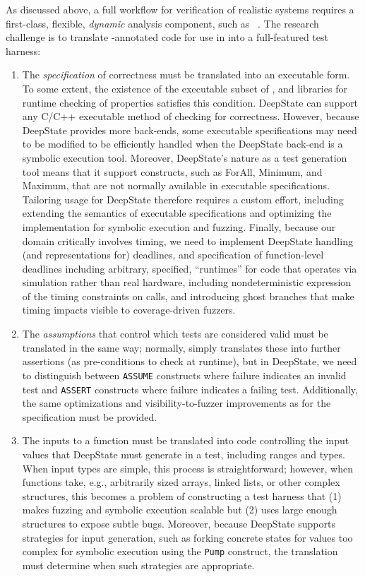 As discussed above, a full workflow for verification of realistic systems requires a first-class, flexible, \emph{dynamic} analysis component, such as \deepstate~\cite{DeepState}.  The research challenge is to translate \acsl-annotated code for use in \framac into a full-featured \deepstate test harness:

\begin{enumerate}[labelsep=3pt,leftmargin=12pt]
\item The \emph{specification} of correctness must be translated into an executable form.  To some extent, the existence of the \eacsl executable subset of \acsl, and libraries for runtime checking of properties satisfies this condition.  DeepState can support any C/C++ executable method of checking for correctness.  However, because DeepState provides more back-ends, some executable specifications may need to be modified to be efficiently handled when the DeepState back-end is a symbolic execution tool.  Moreover, DeepState's nature as a test generation tool means that it support constructs, such as ForAll, Minimum, and Maximum, that are not normally available in executable specifications.  Tailoring \eacsl usage for DeepState therefore requires a custom effort, including extending the semantics of executable specifications and optimizing the implementation for symbolic execution and fuzzing.  Finally, because our domain critically involves timing, we need to implement DeepState handling (and \eacsl representations for) deadlines, and specification of function-level deadlines including arbitrary, specified, ``runtimes'' for code that operates via simulation rather than real hardware, including nondeterministic expression of the timing constraints on calls, and introducing ghost branches that make timing impacts visible to coverage-driven fuzzers.
\item The \emph{assumptions} that control which tests are considered valid must be translated in the same way; normally, \eacsl simply translates these into further assertions (as pre-conditions to check at runtime), but in DeepState, we need to distinguish between {\tt ASSUME} constructs where failure indicates an invalid test and {\tt ASSERT} constructs where failure indicates a failing test.  Additionally, the same optimizations and visibility-to-fuzzer improvements as for the specification must be provided.
\item The inputs to a function must be translated into code controlling the input values that DeepState must generate in a test, including ranges and types.  When input types are simple, this process is straightforward; however, when functions take, e.g., arbitrarily sized arrays, linked lists, or other complex structures, this becomes a problem of constructing a test harness that (1) makes fuzzing and symbolic execution scalable but (2) uses large enough structures to expose subtle bugs.  Moreover, because DeepState supports strategies for input generation, such as forking concrete states for values too complex for symbolic execution using the {\tt Pump} construct, the translation must determine when such strategies are appropriate.

\end{enumerate}
